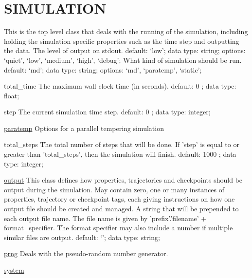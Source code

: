 \section{SIMULATION}
\label{SIMULATION}
\begin{ipifield}{}%
{This is the top level class that deals with the running of the simulation, including holding the simulation specific properties such as the time step and outputting the data.}%
{}%
{%
{The level of output on stdout.}%
{default: `low'; data type: string; options: `quiet', `low', `medium', `high', `debug'; }%
%
{What kind of simulation should be run.}%
{default: `md'; data type: string; options: `md', `paratemp', `static'; }%
}
\begin{ipifield}{total\_time}%
{The maximum wall clock time (in seconds).}%
{default:  0 ; data type: float; }%
{}
\end{ipifield}
\begin{ipifield}{step}%
{The current simulation time step.}%
{default:  0 ; data type: integer; }%
{}
\end{ipifield}
\begin{ipifield}{\hyperref[PARATEMP]{paratemp}}%
{Options for a parallel tempering simulation}%
{}%
{}
\end{ipifield}
\begin{ipifield}{total\_steps}%
{The total number of steps that will be done. If 'step' is equal to or greater than 'total\_steps', then the simulation will finish.}%
{default:  1000 ; data type: integer; }%
{}
\end{ipifield}
\begin{ipifield}{\hyperref[OUTPUTS]{output}}%
{This class defines how properties, trajectories and checkpoints should be output during the simulation. May contain zero, one or many instances of properties, trajectory or checkpoint tags, each giving instructions on how one output file should be created and managed.}%
{}%
{%
{A string that will be prepended to each output file name. The file name is given by 'prefix'.'filename' + format\_specifier. The format specifier may also include a number if multiple similar files are output.}%
{default: `'; data type: string; }%
}
\end{ipifield}
\begin{ipifield}{\hyperref[PRNG]{prng}}%
{Deals with the pseudo-random number generator.}%
{}%
{}
\end{ipifield}
\begin{ipifield}{\hyperref[SYSTEM]{system}}%

\end{ipifield}
\end{ipifield}
